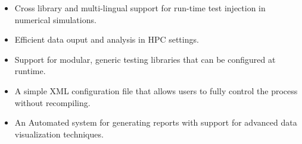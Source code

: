 \begin{itemize}
 \item Cross library and multi-lingual support for run-time test injection in numerical simulations.
 \item Efficient data ouput and analysis in HPC settings.
 \item Support for modular, generic testing libraries that can be configured at runtime.
 \item A simple XML configuration file that allows users to fully control the \VV process without recompiling.
 \item An Automated system for generating \VV reports with support for advanced data visualization techniques.
\end{itemize}
